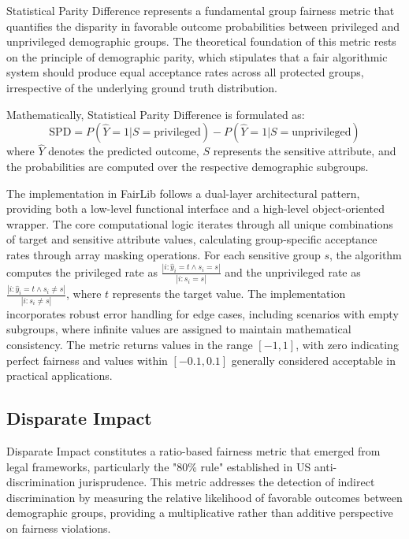 \documentclass[12pt,a4paper,openright,twoside]{book}
\begin{document}
Statistical Parity Difference represents a fundamental group fairness metric that quantifies the disparity in favorable outcome probabilities between privileged and unprivileged demographic groups. The theoretical foundation of this metric rests on the principle of demographic parity, which stipulates that a fair algorithmic system should produce equal acceptance rates across all protected groups, irrespective of the underlying ground truth distribution.

Mathematically, Statistical Parity Difference is formulated as:
\begin{equation}
\text{SPD} = P(\hat{Y}=1|S=\text{privileged}) - P(\hat{Y}=1|S=\text{unprivileged})
\end{equation}
where $\hat{Y}$ denotes the predicted outcome, $S$ represents the sensitive attribute, and the probabilities are computed over the respective demographic subgroups.

The implementation in FairLib follows a dual-layer architectural pattern, providing both a low-level functional interface and a high-level object-oriented wrapper. The core computational logic iterates through all unique combinations of target and sensitive attribute values, calculating group-specific acceptance rates through array masking operations. For each sensitive group $s$, the algorithm computes the privileged rate as $\frac{|{i: \hat{y}_i = t \land s_i = s}|}{|{i: s_i = s}|}$ and the unprivileged rate as $\frac{|{i: \hat{y}_i = t \land s_i \neq s}|}{|{i: s_i \neq s}|}$, where $t$ represents the target value. The implementation incorporates robust error handling for edge cases, including scenarios with empty subgroups, where infinite values are assigned to maintain mathematical consistency. The metric returns values in the range $[-1, 1]$, with zero indicating perfect fairness and values within $[-0.1, 0.1]$ generally considered acceptable in practical applications.

\subsection{Disparate Impact}

Disparate Impact constitutes a ratio-based fairness metric that emerged from legal frameworks, particularly the "80\% rule" established in US anti-discrimination jurisprudence. This metric addresses the detection of indirect discrimination by measuring the relative likelihood of favorable outcomes between demographic groups, providing a multiplicative rather than additive perspective on fairness violations.
\end{document}
